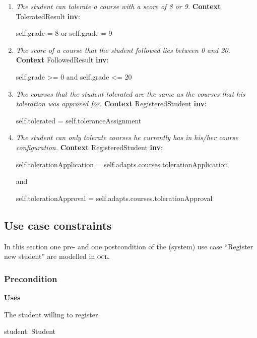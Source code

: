 \begin{enumerate}
	
	\item \emph{The student can tolerate a course with a score of 8 or 9.}
	\npar \textbf{Context} ToleratedResult \textbf{inv}:
	\par \hspace*{5 mm} self.grade = 8 or self.grade = 9
	
	\item \emph{The score of a course that the student followed lies between 0 and
	20.}
	\npar \textbf{Context} FollowedResult \textbf{inv}:
	\par \hspace*{5 mm} self.grade >= 0 and self.grade <= 20
	
	\item \emph{The courses that the student tolerated are the same as the courses
	that his toleration was approved for.}
	\npar \textbf{Context} RegisteredStudent \textbf{inv}:
	\par \hspace*{5 mm} self.tolerated = self.toleranceAssignment
	
	\item \emph{The student can only tolerate courses he currently has in his/her
	course configuration.} 
	\npar \textbf{Context} RegisteredStudent \textbf{inv}:
	\par \hspace*{5 mm} self.tolerationApplication =
	self.adapts.courses.tolerationApplication
	\par \hspace*{10 mm} and
	\par \hspace*{5 mm} self.tolerationApproval =
	self.adapts.courses.tolerationApproval
	
\end{enumerate}

\subsection{Use case constraints}

\npar In this section one pre- and one postcondition of the (system) use case
``Register new student'' are modelled in \textsc{ocl}.

\subsubsection{Precondition}

\par \hspace*{5 mm} \textbf{Uses}
\par \hspace*{10 mm} The student willing to register.
\par \hspace*{13 mm} student: Student

